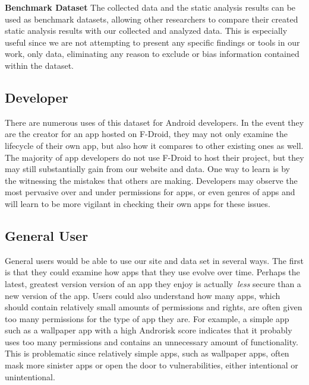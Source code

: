 %



\textbf{Benchmark Dataset}
The collected data and the static analysis results can be used as benchmark datasets, allowing other researchers to compare their created static analysis results with our collected and analyzed data. This is especially useful since we are not attempting to present any specific findings or tools in our work, only data, eliminating any reason to exclude or bias information contained within the dataset.


\subsection{Developer}

There are numerous uses of this dataset for Android developers. In the event they are the creator for an app hosted on F-Droid, they may not only examine the lifecycle of their own app, but also how it compares to other existing ones as well. The majority of app developers do not use F-Droid to host their project, but they may still substantially gain from our website and data. One way to learn is by the witnessing the mistakes that others are making. Developers may observe the most pervasive over and under permissions for apps, or even genres of apps and will learn to be more vigilant in checking their own apps for these issues. 

%







\subsection{General User}

General users would be able to use our site and data set in several ways. The first is that they could examine how apps that they use evolve over time. Perhaps the latest, greatest version version of an app they enjoy is actually~\emph{less} secure than a new version of the app. Users could also understand how many apps, which should contain relatively small amounts of permissions and rights, are often given too many permissions for the type of app they are. For example, a simple app such as a wallpaper app with a high Androrisk score indicates that it probably uses too many permissions and contains an unnecessary amount of functionality. This is problematic since relatively simple apps, such as wallpaper apps, often mask more sinister apps or open the door to vulnerabilities, either intentional or unintentional.


